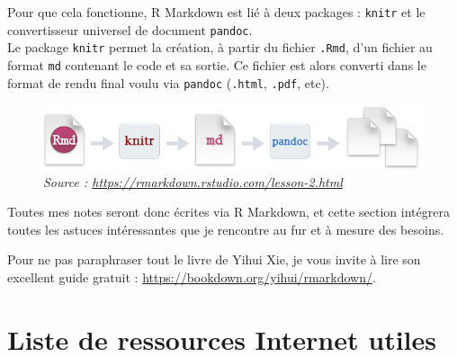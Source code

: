 \documentclass[
]{book}
\begin{document}
Pour que cela fonctionne, R Markdown est lié à deux packages : \texttt{knitr} et le
convertisseur universel de document \texttt{pandoc}.\\
Le package \texttt{knitr} permet la création, à partir du fichier \texttt{.Rmd}, d'un fichier
au format \texttt{md} contenant le code et sa sortie. Ce fichier est alors converti
dans le format de rendu final voulu via \texttt{pandoc} (\texttt{.html}, \texttt{.pdf}, etc).

\begin{figure}
\centering
\includegraphics{images/rmarkdownflow.png}
\caption{\emph{Source : \url{https://rmarkdown.rstudio.com/lesson-2.html}}}
\end{figure}

Toutes mes notes seront donc écrites via R Markdown, et cette section intégrera
toutes les astuces intéressantes que je rencontre au fur et à mesure des
besoins.

Pour ne pas paraphraser tout le livre de Yihui Xie, je vous invite à
lire son excellent guide gratuit : \url{https://bookdown.org/yihui/rmarkdown/}.

\hypertarget{liste-de-ressources-internet-utiles}{%
\section*{Liste de ressources Internet utiles}\label{liste-de-ressources-internet-utiles}}
\end{document}
